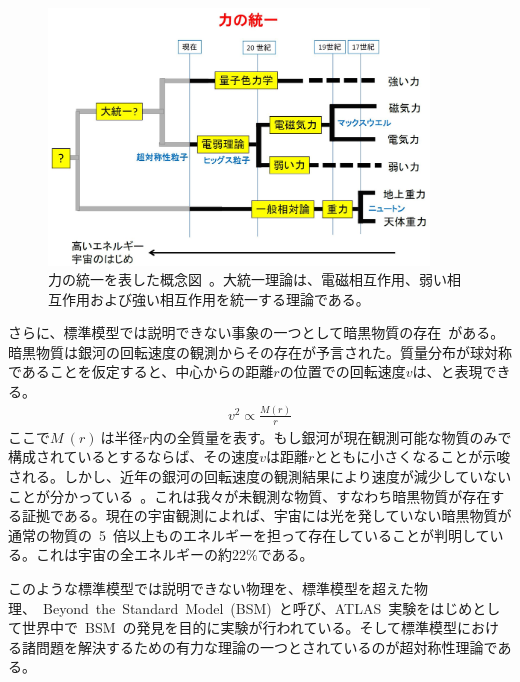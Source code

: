 \begin{figure}[tb]
        \centering   
        \includegraphics[width=0.9\textwidth]{img/jpeg/physics_bsm_05.jpg}
        \caption[力の統一を表した概念図]{力の統一を表した概念図~\cite{URL:01}。大統一理論は、電磁相互作用、弱い相互作用および強い相互作用を統一する理論である。}\label{fig:gut}
\end{figure}


さらに、標準模型では説明できない事象の一つとして暗黒物質の存在~\cite{AR:11}がある。暗黒物質は銀河の回転速度の観測からその存在が予言された。質量分布が球対称であることを仮定すると、中心からの距離$r$の位置での回転速度$v$は、と表現できる。
\begin{align}
    v^2\propto\frac{M(r)}{r} \label{eq:dark}
\end{align}
ここで$M~(r)~$は半径$r$内の全質量を表す。もし銀河が現在観測可能な物質のみで構成されているとするならば、その速度$v$は距離$r$とともに小さくなることが示唆される。しかし、近年の銀河の回転速度の観測結果により速度が減少していないことが分かっている~\cite{AR:16}。これは我々が未観測な物質、すなわち暗黒物質が存在する証拠である。現在の宇宙観測によれば、宇宙には光を発していない暗黒物質が通常の物質の~5~倍以上ものエネルギーを担って存在していることが判明している。これは宇宙の全エネルギーの約$22\%$である。

このような標準模型では説明できない物理を、標準模型を超えた物理、~Beyond~the~Standard~Model~(BSM)~と呼び、ATLAS~実験をはじめとして世界中で~BSM~の発見を目的に実験が行われている。そして標準模型における諸問題を解決するための有力な理論の一つとされているのが超対称性理論である。


